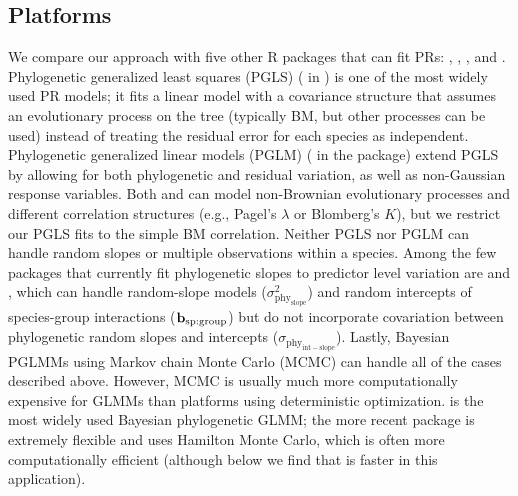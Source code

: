 \documentclass[12pt]{article}
\begin{document}
\subsection*{Platforms}

We compare our approach with five other R packages that can fit PRs:  \citep{pinheiro2014r},  \citep{ho2014phylolm},  \citep{pearse2015pez},  \citep{phyr} and  \citep{burkner2018brms}.
Phylogenetic generalized least squares (PGLS) ( in ) is one of the most widely used PR models; it fits a linear model with a covariance structure that assumes an evolutionary process on the tree (typically BM, but other processes can be used) instead of treating the residual error for each species as independent.
Phylogenetic generalized linear models (PGLM) ( in the  package) extend PGLS by allowing for both phylogenetic and residual variation, as well as non-Gaussian response variables.
Both  and  can model non-Brownian evolutionary processes and different correlation structures (e.g., Pagel's $\lambda$ or Blomberg's $K$), but we restrict our PGLS fits to the simple BM correlation.
Neither PGLS nor PGLM can handle random slopes or multiple observations within a species.
Among the few packages that currently fit phylogenetic slopes to predictor level variation are  and , which can handle random-slope models ($\sigma^2_{\mathrm{phy_{slope}}}$) and random intercepts of species-group interactions ($\bf{b_{\mathrm{sp:group}}}$) but do not incorporate covariation between phylogenetic random slopes and intercepts ($\sigma_{\mathrm{phy_{int-slope}}}$).
Lastly, Bayesian PGLMMs using Markov chain Monte Carlo (MCMC) can handle all of the cases described above. 
However, MCMC is usually much more computationally expensive for GLMMs than platforms using deterministic optimization.
 \citep{hadfield2010general} is the most widely used Bayesian phylogenetic GLMM;  the more recent package is extremely flexible and uses Hamilton Monte Carlo, which is often more computationally efficient (although below we find that  is faster in this application).
 
\end{document}
